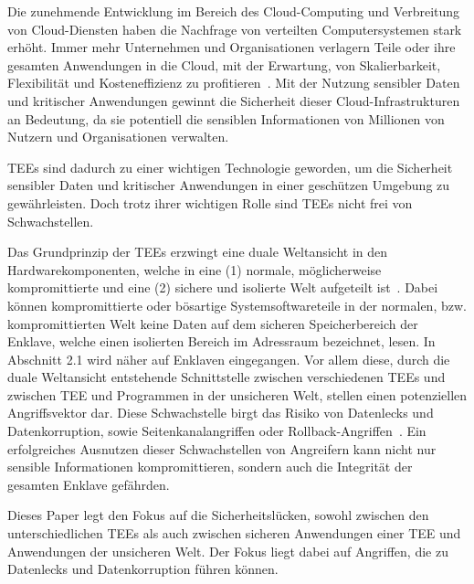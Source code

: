 Die zunehmende Entwicklung im Bereich des Cloud-Computing und Verbreitung von Cloud-Diensten haben die Nachfrage von verteilten Computersystemen stark erhöht. 
Immer mehr Unternehmen und Organisationen verlagern Teile oder ihre gesamten Anwendungen in die Cloud, mit der Erwartung, von Skalierbarkeit, Flexibilität und Kosteneffizienz zu profitieren~\cite{Cloud}. 
Mit der Nutzung sensibler Daten und kritischer Anwendungen gewinnt die Sicherheit dieser Cloud-Infrastrukturen an Bedeutung, da sie potentiell die sensiblen Informationen von Millionen von Nutzern und Organisationen verwalten.

TEEs sind dadurch zu einer wichtigen Technologie geworden, um die Sicherheit sensibler Daten und kritischer Anwendungen in einer geschützen Umgebung zu gewährleisten. Doch trotz ihrer wichtigen Rolle sind TEEs nicht frei von Schwachstellen. 

Das Grundprinzip der TEEs erzwingt eine duale Weltansicht in den Hardwarekomponenten, welche in eine (1) normale, möglicherweise kompromittierte und eine (2) sichere und isolierte Welt aufgeteilt ist~\cite{TEEPaper}. 
Dabei können kompromittierte oder bösartige Systemsoftwareteile in der normalen, bzw. kompromittierten Welt keine Daten auf dem sicheren Speicherbereich der Enklave, welche einen isolierten Bereich im Adressraum bezeichnet, lesen. In Abschnitt 2.1 wird näher auf Enklaven eingegangen. Vor allem diese, durch die duale Weltansicht entstehende Schnittstelle zwischen verschiedenen TEEs und zwischen TEE und Programmen in der unsicheren Welt, stellen einen potenziellen Angriffsvektor dar.
Diese Schwachstelle birgt das Risiko von Datenlecks und Datenkorruption, sowie Seitenkanalangriffen oder Rollback-Angriffen~\cite{Memory, TEEPaper}. Ein erfolgreiches Ausnutzen dieser Schwachstellen von Angreifern kann nicht nur sensible Informationen kompromittieren, sondern auch die Integrität der gesamten Enklave gefährden. 

Dieses Paper legt den Fokus auf die Sicherheitslücken, sowohl zwischen den unterschiedlichen TEEs als auch zwischen sicheren Anwendungen einer TEE und Anwendungen der unsicheren Welt. Der Fokus liegt dabei auf Angriffen, die zu Datenlecks und Datenkorruption führen können.